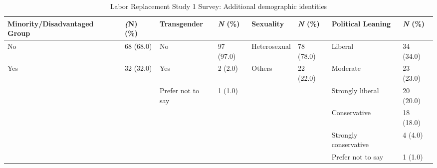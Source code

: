 \begin{table*}[htpb]
    \centering
    \footnotesize
    \begin{tabular}{ll|ll|ll|ll}
    \toprule
         \textbf{Minority/Disadvantaged Group} & \textbf{\textit(N) (\%)} & \textbf{Transgender} & \textbf{\textit{N} (\%)} & \textbf{Sexuality} & \textbf{\textit{N} (\%)} & \textbf{Political Leaning} & \textbf{\textit{N} (\%)} \\
         \midrule
No & 68 (68.0) & No & 97 (97.0) & Heterosexual & 78 (78.0) & Liberal & 34 (34.0)\\
Yes & 32 (32.0) & Yes & 2 (2.0) & Others & 22 (22.0) & Moderate & 23 (23.0)\\
 &  & Prefer not to say & 1 (1.0) & & & Strongly liberal & 20 (20.0)\\
 &  &  &  &  &  & Conservative & 18 (18.0)\\
 &  &  &  &  &  & Strongly conservative & 4 (4.0)\\
 &  &  &  &  &  & Prefer not to say & 1 (1.0)\\
\bottomrule
    \end{tabular}
    \caption{Labor Replacement Study 1 Survey: Additional demographic identities}
    \label{app:demographics-2-jobs-p1}
\end{table*}